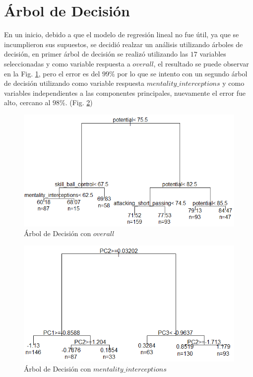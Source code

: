 \documentclass[a4paper,10pt,twocolumn]{article}
\begin{document}
\section{Árbol de Decisión}\label{sec:dtree}

En un inicio, debido a que el modelo de regresión lineal no fue útil, ya que se incumplieron sus supuestos, se decidió realzar un análisis utilizando árboles de decisión, en primer árbol de decisión se realizó utilizando las $17$ variables seleccionadas y como variable respuesta a $overall$, el resultado se puede observar en la Fig. \ref{fig:dtree}, pero el error es del $99\%$ por lo que se intento con un segundo árbol de decisión utilizando como variable respuesta $mentality\_interceptions$ y como variables independientes a las componentes principales, nuevamente el error fue alto, cercano al $98\%$. (Fig. \ref{fig:dtree2})

\begin{figure}[htb]%
	\begin{center}
		\includegraphics[width=\linewidth]{dtree}
	\end{center}
	\caption{Árbol de Decisión con $overall$ \label{fig:dtree}}%
\end{figure}

\begin{figure}[htb]%
	\begin{center}
		\includegraphics[width=\linewidth]{dtree2}
	\end{center}
	\caption{Árbol de Decisión con $mentality\_interceptions$ \label{fig:dtree2}}%
\end{figure}
\end{document}
